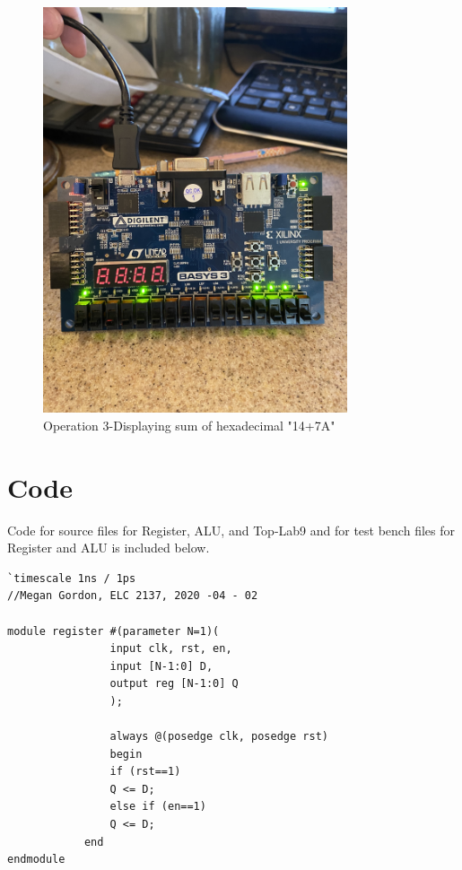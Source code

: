 \documentclass[11pt]{article}
\begin{document}
\begin{figure}[ht]\centering
	\includegraphics[angle=270, width=0.8\textwidth]{step3.jpg}
	\caption{Operation 3-Displaying sum of hexadecimal "14+7A"}
	\label{fig:sim_with_table}
\end{figure}
\clearpage





\section*{Code}

Code for source files for Register, ALU, and Top-Lab9 and for test bench files for Register and ALU is included below.

\begin{lstlisting}[style=Verilog,caption=Register Module Code,label=code:ex ]
`timescale 1ns / 1ps
//Megan Gordon, ELC 2137, 2020 -04 - 02

module register #(parameter N=1)(
				input clk, rst, en,
				input [N-1:0] D,
				output reg [N-1:0] Q
				);
				
				always @(posedge clk, posedge rst)
				begin
				if (rst==1)
				Q <= D;
				else if (en==1)
				Q <= D;
			end
endmodule
\end{lstlisting}
\end{document}
